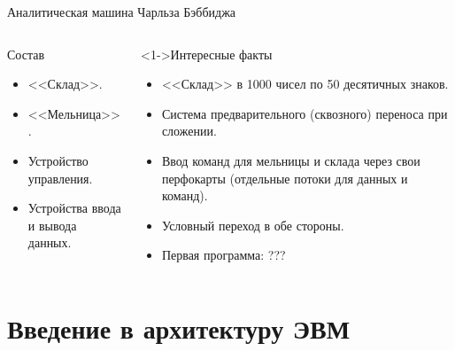\documentclass[pdf,9pt,aspectratio=169]{beamer}
\begin{document}
\begin{frame}{Аналитическая машина Чарльза Бэббиджа}
\begin{columns}[T]
\begin{column}[]{0.45\textwidth}
\begin{exampleblock}
\begin{center}
        \end{center}
      \end{exampleblock}
      \begin{block}{Состав}
        \begin{itemize}
          \item {<<Склад>>}.
          \item {<<Мельница>>}.
          \item Устройство управления.
          \item Устройства ввода и вывода данных.
        \end{itemize}
      \end{block}
    \end{column}
    \begin{column}[]{0.45\textwidth}  
      \begin{block}<1->{Интересные факты}
        \begin{itemize}
          \item {<<Склад>>} в 1000 чисел по 50 десятичных знаков.
          \item Система предварительного (сквозного) переноса при сложении.
          \item Ввод команд для мельницы и склада через  свои перфокарты (отдельные потоки для данных и команд).
          \item Условный переход в обе стороны.
          \item Первая программа: ???
        \end{itemize}
      \end{block}
    \end{column}
  \end{columns}
\end{frame}

\section[Введение в архитектуру ЭВМ]{Введение в архитектуру ЭВМ}
\end{document}

